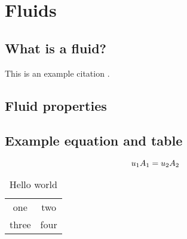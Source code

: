 
\chapter{Fluids}

\section{What is a fluid?}
This is an example citation \citep{Janeway:2392}.

\section{Fluid properties}

\section{Example equation and table}

\begin{equation}
u_1 A_1 = u_2 A_2
\label{eq:continuity}
\index{equation!continuity}
\end{equation}

\begin{table}
\caption{Hello world}
\begin{center}
\begin{tabular}{cc}
one & two \\
three & four \\
\end{tabular}
\end{center}
\end{table}



